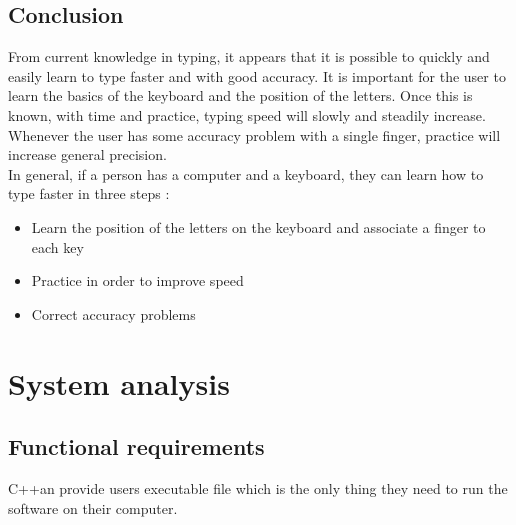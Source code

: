 \chapter{Conclusion}
From current knowledge in typing, it appears that it is possible to quickly and easily learn to type faster and with good accuracy. It is important for the user to learn the basics of the keyboard and the position of the letters. Once this is known, with time and practice, typing speed will slowly and steadily increase.\\
Whenever the user has some accuracy problem with a single finger, practice will increase general precision.\\
In general, if a person has a computer and a keyboard, they can learn how to type faster in three steps :
\begin{itemize}
	\item Learn the position of the letters on the keyboard and associate a finger to each key
	\item Practice in order to improve speed
	\item Correct accuracy problems
\end{itemize}

\begin{flushleft}
	
	
\end{flushleft}

\part{System analysis}

\chapter{Functional requirements}
C++an provide users executable file which is the only thing they need to run the software on their computer.

